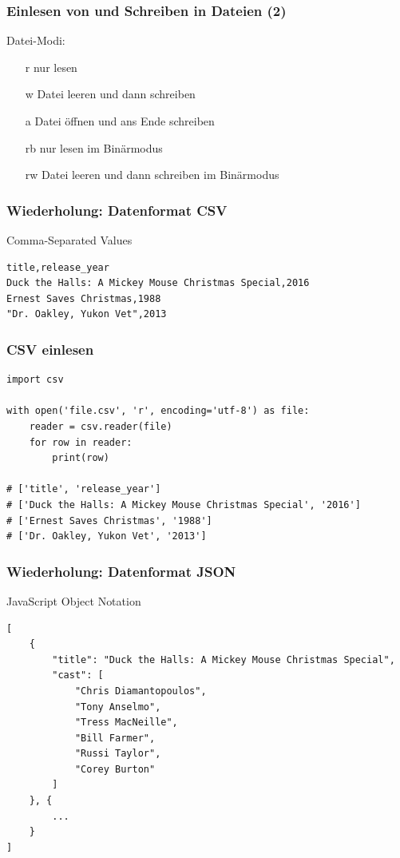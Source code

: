 \begin{frame}[fragile]
	\frametitle{Einlesen von und Schreiben in Dateien (2)}
	
	Datei-Modi:
	
	\begin{itemize}
		\item[\alert{r}] nur lesen
		\item[\alert{w}] Datei leeren und dann schreiben
		\item[\alert{a}] Datei öffnen und ans Ende schreiben
		\item[\alert{rb}] nur lesen im Binärmodus
		\item[\alert{rw}] Datei leeren und dann schreiben im Binärmodus
	\end{itemize}
\end{frame}

\begin{frame}[fragile]
	\frametitle{Wiederholung: Datenformat CSV}
	
	\alert{C}omma-\alert{S}eparated \alert{V}alues
	
\begin{verbatim}
title,release_year
Duck the Halls: A Mickey Mouse Christmas Special,2016
Ernest Saves Christmas,1988
"Dr. Oakley, Yukon Vet",2013
\end{verbatim}
\end{frame}

\begin{frame}[fragile]
	\frametitle{CSV einlesen}
	
	\begin{verbatim}
import csv

with open('file.csv', 'r', encoding='utf-8') as file:
    reader = csv.reader(file)
    for row in reader:
        print(row)
    
# ['title', 'release_year']
# ['Duck the Halls: A Mickey Mouse Christmas Special', '2016']
# ['Ernest Saves Christmas', '1988']
# ['Dr. Oakley, Yukon Vet', '2013']
\end{verbatim}
\end{frame}

\begin{frame}[fragile]
	\frametitle{Wiederholung: Datenformat JSON}
	
	\alert{J}ava\alert{S}cript \alert{O}bject \alert{N}otation
	
	\begin{verbatim}
[
    {
        "title": "Duck the Halls: A Mickey Mouse Christmas Special",
        "cast": [
            "Chris Diamantopoulos",
            "Tony Anselmo",
            "Tress MacNeille",
            "Bill Farmer",
            "Russi Taylor",
            "Corey Burton"
        ]
    }, {
        ...
    }
]
\end{verbatim}
\end{frame}

